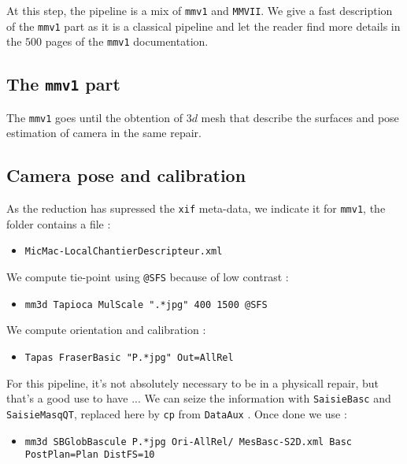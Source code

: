 At this step, the pipeline is a mix of {\tt mmv1} and {\tt MMVII}. We give a fast description
of the {\tt mmv1} part as it is a classical pipeline and let the reader find more details
in the $500$ pages of the  {\tt mmv1} documentation.



\subsection{The  {\tt mmv1} part}

The  {\tt mmv1} goes until the obtention of $3d$ mesh that describe the surfaces and
pose estimation of camera in the same repair.


\subsection{Camera pose and calibration}

As the reduction has supressed the {\tt xif} meta-data, we indicate it
for {\tt mmv1}, the folder contains a file :

\begin{itemize}
    \item {\tt MicMac-LocalChantierDescripteur.xml}
\end{itemize}

We compute tie-point using {\tt @SFS} because of low contrast :

\begin{itemize}
    \item {\tt mm3d Tapioca MulScale ".*jpg" 400 1500 @SFS}
\end{itemize}

We compute orientation and calibration : 

\begin{itemize}
   \item {\tt Tapas FraserBasic "P.*jpg" Out=AllRel}
\end{itemize}

For  this pipeline, it's not absolutely necessary to be in a physicall repair,
but that's a good use to have ... We can seize the information with
{\tt SaisieBasc} and {\tt SaisieMasqQT}, replaced here by {\tt cp} from {\tt DataAux} . 
Once done we use :

\begin{itemize}
    \item {\tt mm3d SBGlobBascule P.*jpg Ori-AllRel/ MesBasc-S2D.xml Basc  PostPlan=Plan DistFS=10}
\end{itemize}

